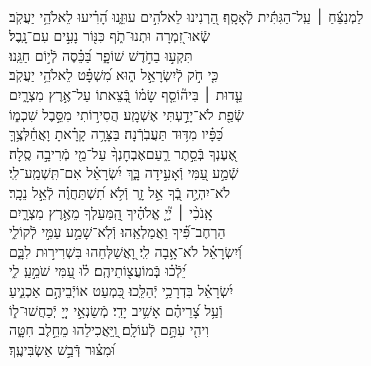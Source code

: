 \documentclass[twoside, openany, parskip=half, 11pt]{book}
\begin{document}
\\
\vspace{-1.5\baselineskip}
\begin{narrow}
%
לַמְנַצֵּ֬חַ ׀ עַֽל־הַגִּתִּ֬ית לְֿאָסָֽף׃ \hfill \break
הַ֭רְנִינוּ לֵאלֹהִ֣ים עוּזֵּ֑נוּ \hfill הָ֝רִ֗יעוּ לֵאלֹהֵ֥י יַעֲקֹֽב׃ \\
שְֽֿׂאוּ־זִ֭מְרָה וּתְנוּ־תֹ֑ף \hfill כִּנּ֖וֹר נָעִ֣ים עִם־נָֽבֶל׃ \\
תִּקְע֣וּ בַחֹ֣דֶשׁ שׁוֹפָ֑ר \hfill בַּ֝כֵּ֗סֶה לְֿי֣וֹם חַגֵּֽנוּ׃ \\
כִּ֤י חֹ֣ק לְֿיִשְׂרָאֵ֣ל ה֑וּא \hfill מִ֝שְׁפָּ֗ט לֵאלֹהֵ֥י יַעֲקֹֽב׃ \\
עֵ֤דוּת ׀ בִּיה֘וֹסֵ֤ף שָׂמ֗וֹ \hfill בְּֿ֭צֵאתוֹ עַל־אֶ֣רֶץ מִצְרָ֑יִם \\ שְֿׂפַ֖ת לֹא־יָדַ֣עְתִּי אֶשְׁמָֽע׃ \hfill
הֲסִיר֣וֹתִי מִסֵּ֣בֶל שִׁכְמ֑וֹ \\ כַּ֝פָּ֗יו מִדּ֥וּד תַּעֲבֹֽרְֿנָה׃ \hfill
בַּצָּרָ֥ה קָרָ֗אתָ וָאֲחַ֫לְּצֶ֥ךָּ \\ אֶ֭עֶנְךָ בְּֿסֵ֣תֶר רַ֑עַם\hfill אֶבְחׇנְךָ֨ עַל־מֵ֖י מְֿרִיבָ֣ה סֶֽלָה׃ \\
שְֿׁמַ֣ע עַ֭מִּי וְֿאָעִ֣ידָה בָּ֑ךְ \hfill יִ֝שְׂרָאֵ֗ל אִם־תִּֽשְׁמַֽע־לִֽי׃ \\
לֹא־יִהְיֶ֣ה בְֿ֭ךָ אֵ֣ל זָ֑ר \hfill וְֿלֹ֥א תִ֝שְׁתַּחֲוֶ֗ה לְֿאֵ֣ל נֵכָֽר׃ \\
אָֽנֹכִ֨י ׀ יְ֘יָ֤ אֱלֹהֶ֗יךָ \hfill הַֽ֭מַּעַלְךָ מֵאֶ֣רֶץ מִצְרָ֑יִם \\ הַרְחֶב־פִּ֗֝יךָ וַאֲמַלְאֵֽהוּ׃ \hfill
וְֿלֹֽא־שָׁמַ֣ע עַמִּ֣י לְֿקוֹלִ֑י \\ וְֿ֝יִשְׂרָאֵ֗ל לֹא־אָ֥בָה לִֽי׃ \hfill
וָ֭אֲשַׁלְּחֵהוּ בִּשְׁרִיר֣וּת לִבָּ֑ם \\ יֵ֝לְֿכ֗וּ בְּֽֿמוֹעֲצ֖וֹתֵיהֶֽם׃ \hfill
ל֗וּ עַ֭מִּי שֹׁמֵ֣עַֽ לִ֑י \\ יִ֝שְׂרָאֵ֗ל בִּדְרָכַ֥י יְֿהַלֵּֽכוּ׃ \hfill
כִּ֭מְעַט אוֹיְֿבֵיהֶ֣ם אַכְנִ֑יעַ \\ וְֿעַ֥ל צָ֝רֵיהֶ֗ם אָשִׁ֥יב יָדִֽי׃ \hfill
מְֿשַׂנְאֵ֣י יְיָ֭ יְֿכַחֲשׁוּ־ל֑וֹ \\ וִיהִ֖י עִתָּ֣ם לְֿעוֹלָֽם׃ \hfill
וַֽ֭יַּאֲכִילֵהוּ מֵחֵ֣לֶב חִטָּ֑ה \\ וּ֝מִצּ֗וּר דְּֿבַ֣שׁ אַשְׂבִּיעֶֽךָ׃ \hfill \break
\end{narrow}
\end{document}
